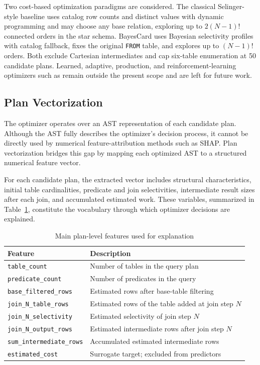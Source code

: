 \documentclass[conference]{IEEEtran}
\begin{document}
Two cost-based optimization paradigms are considered. The classical Selinger-style baseline uses catalog row counts and distinct values with dynamic programming and may choose any base relation, exploring up to $2(N-1)!$ connected orders in the star schema. BayesCard \cite{b10} uses Bayesian selectivity profiles with catalog fallback, fixes the original \texttt{FROM} table, and explores up to $(N-1)!$ orders. Both exclude Cartesian intermediates and cap six-table enumeration at 50 candidate plans. Learned, adaptive, production, and reinforcement-learning optimizers such as \cite{b14} remain outside the present scope and are left for future work.


\subsection{Plan Vectorization}

The optimizer operates over an AST representation of each candidate plan. Although the AST fully describes the optimizer's decision process, it cannot be directly used by numerical feature-attribution methods such as SHAP. Plan vectorization bridges this gap by mapping each optimized AST to a structured numerical feature vector.

For each candidate plan, the extracted vector includes structural characteristics, initial table cardinalities, predicate and join selectivities, intermediate result sizes after each join, and accumulated estimated work. These variables, summarized in Table~\ref{tab:features}, constitute the vocabulary through which optimizer decisions are explained.

\begin{table}[htbp]
\caption{Main plan-level features used for explanation}
\label{tab:features}
\centering
\footnotesize
\begin{tabular}{p{} p{}}
\toprule
\textbf{Feature} & \textbf{Description} \\
\midrule
\texttt{table\_count} & Number of tables in the query plan \\
\texttt{predicate\_count} & Number of predicates in the query \\
\texttt{base\_filtered\_rows} & Estimated rows after base-table filtering \\
\texttt{join\_N\_table\_rows} & Estimated rows of the table added at join step $N$ \\
\texttt{join\_N\_selectivity} & Estimated selectivity of join step $N$ \\
\texttt{join\_N\_output\_rows} & Estimated intermediate rows after join step $N$ \\
\texttt{sum\_intermediate\_rows} & Accumulated estimated intermediate rows \\
\texttt{estimated\_cost} & Surrogate target; excluded from predictors \\
\bottomrule
\end{tabular}
\end{table}
\end{document}
